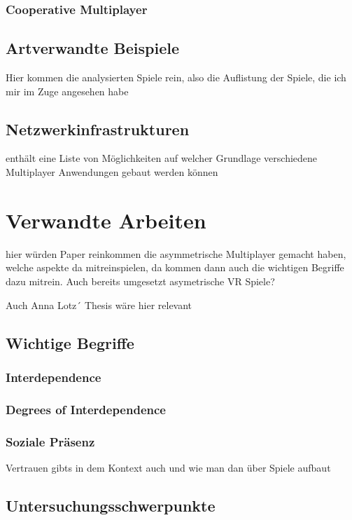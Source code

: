 \subsection{Cooperative Multiplayer}

\section{Artverwandte Beispiele}
Hier kommen die analysierten Spiele rein, also die Auflistung der Spiele, die ich mir im Zuge angesehen habe

\section{Netzwerkinfrastrukturen}

enthält eine Liste von Möglichkeiten auf welcher Grundlage verschiedene Multiplayer Anwendungen gebaut werden können


\chapter{Verwandte Arbeiten}

\cite{harris_asymmetry_2019}
\cite{sajjadi_maze_2014}

hier würden Paper reinkommen die asymmetrische Multiplayer gemacht haben, welche aspekte da mitreinspielen, da kommen dann auch die wichtigen Begriffe dazu mitrein. Auch bereits umgesetzt asymetrische VR Spiele?


Auch Anna Lotz´ Thesis wäre hier relevant


\section{Wichtige Begriffe}

\subsection{Interdependence}
\cite{harris_leveraging_2016}
\cite{depping_cooperation_2017}

\subsection{Degrees of Interdependence}
\cite{beznosyk_effect_2012}

\subsection{Soziale Präsenz}

Vertrauen gibts in dem Kontext auch und wie man dan über Spiele aufbaut

\section{Untersuchungsschwerpunkte}